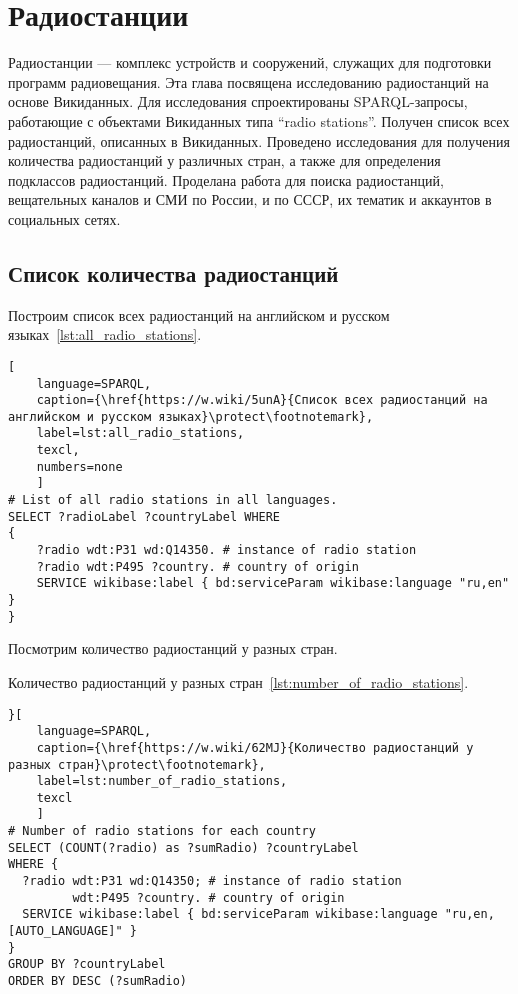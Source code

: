 \chapter[Радиостанции]{Радиостанции}
\label{ch:radio-station}

Радиостанции — комплекс устройств и сооружений, служащих для подготовки программ радиовещания. Эта глава посвящена исследованию радиостанций на основе Викиданных. Для исследования спроектированы SPARQL-запросы, работающие с объектами Викиданных типа “radio stations”. Получен список всех радиостанций, описанных в Викиданных. Проведено исследования для получения количества радиостанций у различных стран, а также для определения подклассов радиостанций. Проделана работа для поиска радиостанций, вещательных каналов и СМИ по России, и по СССР, их тематик и аккаунтов в социальных сетях.


\section{Список количества радиостанций}

Построим список всех радиостанций на английском и русском языках~\ref{lst:all_radio_stations}.
\begin{lstlisting}[ 
    language=SPARQL,
    caption={\href{https://w.wiki/5unA}{Cписок всех радиостанций на английском и русском языках}\protect\footnotemark},
    label=lst:all_radio_stations,
    texcl,
    numbers=none
    ]
# List of all radio stations in all languages.
SELECT ?radioLabel ?countryLabel WHERE
{
    ?radio wdt:P31 wd:Q14350. # instance of radio station
    ?radio wdt:P495 ?country. # country of origin
    SERVICE wikibase:label { bd:serviceParam wikibase:language "ru,en" }
}
\end{lstlisting}%

\newpage

Посмотрим количество радиостанций у разных стран.

Количество радиостанций у разных стран~\ref{lst:number_of_radio_stations}.

\begin{lstlisting}}[ 
    language=SPARQL,
    caption={\href{https://w.wiki/62MJ}{Количество радиостанций у разных стран}\protect\footnotemark},
    label=lst:number_of_radio_stations,
    texcl
    ]
# Number of radio stations for each country
SELECT (COUNT(?radio) as ?sumRadio) ?countryLabel
WHERE {
  ?radio wdt:P31 wd:Q14350; # instance of radio station
         wdt:P495 ?country. # country of origin
  SERVICE wikibase:label { bd:serviceParam wikibase:language "ru,en,[AUTO_LANGUAGE]" }
}
GROUP BY ?countryLabel
ORDER BY DESC (?sumRadio)
\end{lstlisting}%

